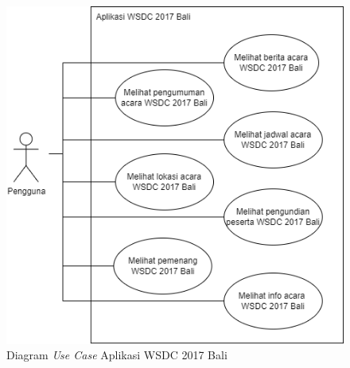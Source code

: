 \begin{figure}[H]
		\centering
	    \includegraphics[scale=0.4]{Gambar/useCaseDiagram.png}
	    \caption{Diagram {\it Use Case} Aplikasi WSDC 2017 Bali}
	    \label{fig:useCaseDiagram}
\end{figure}

